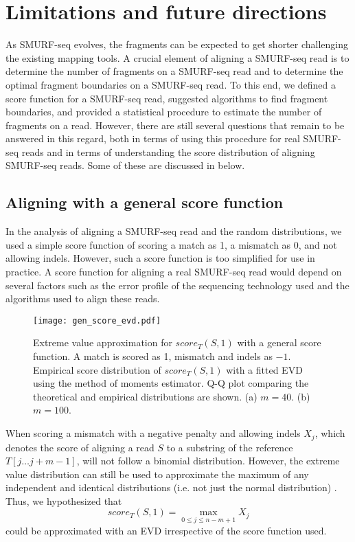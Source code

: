 \section{Limitations and future directions}
As SMURF-seq evolves, the fragments can be expected to get shorter
challenging the existing mapping tools. A crucial element of aligning a
SMURF-seq read is to determine the number of fragments on a SMURF-seq
read and to determine the optimal fragment boundaries on a SMURF-seq
read. To this end, we defined a score function for a SMURF-seq read,
suggested algorithms to find fragment boundaries, and provided a
statistical procedure to estimate the number of fragments on a read.
%
However, there are still several questions that remain to be answered in
this regard, both in terms of using this procedure for real SMURF-seq
reads and in terms of understanding the score distribution of aligning
SMURF-seq reads. Some of these are discussed in below.


\subsection*{Aligning with a general score function}
In the analysis of aligning a SMURF-seq read and the random
distributions, we used a simple score function of scoring a match as 1,
a mismatch as 0, and not allowing indels. However, such a score function
is too simplified for use in practice. A score function for aligning a
real SMURF-seq read would depend on several factors such as the error
profile of the sequencing technology used and the algorithms used to
align these reads.

\begin{figure}[b!]
\centering
\texttt{[image: gen\_score\_evd.pdf]}
\caption[Extreme value approximation for $score_T(S,1)$ with a general
  score function]{
  Extreme value approximation for $score_T(S,1)$ with a general score
  function. A match is scored as 1, mismatch and indels as $-1$.
  Empirical score distribution of $score_T(S,1)$ with a fitted
  EVD using the method of moments estimator.
  Q-Q plot comparing the theoretical and empirical distributions are shown.
  (a) $m=40$.
  (b) $m=100$.}
\label{gen_score_evd}
\end{figure}

When scoring a mismatch with a negative penalty and allowing indels
$X_j$, which denotes the score of aligning a read $S$ to a substring of
the reference $T[j \dots j+m-1]$, will not follow a binomial
distribution.
%
However, the extreme value distribution can still be used to approximate
the maximum of any independent and identical distributions (i.e. not
just the normal distribution) \citep{kotz2000extreme}.  Thus, we
hypothesized that \[score_T(S,1) = \max_{0 \leq j \leq n-m+1} X_j\]
could be approximated with an EVD irrespective of the score function
used.

